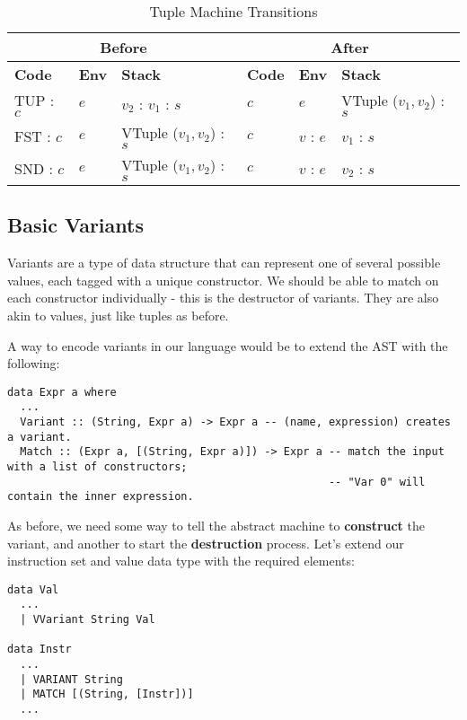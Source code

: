 \begin{table}[h]
    \centering
    \small
    \begin{tabular}{|l|l|l||l|l|l|}
        \hline
        \multicolumn{3}{|c||}{\textbf{Before}} & \multicolumn{3}{c|}{\textbf{After}} \\
        \hline
        \textbf{Code} & \textbf{Env} & \textbf{Stack} & \textbf{Code} & \textbf{Env} & \textbf{Stack} \\
        \hline
        TUP : \(c\) & \( e \) & \( v_2 \) : \( v_1 \) : \( s \) & \( c \) & \( e \) & VTuple (\( v_1, v_2 \)) : \( s \) \\
        FST : \(c\) & \( e \) & VTuple (\( v_1, v_2 \)) : \( s \) & \( c \) & \( v \) : \( e \) & \( v_1 \) : \( s \) \\
        SND : \(c\) & \( e \) & VTuple (\( v_1, v_2 \)) : \( s \) & \( c \) & \( v \) : \( e \) & \( v_2 \) : \( s \) \\
        \hline
    \end{tabular}
    \caption{Tuple Machine Transitions}
\end{table}

\subsection{Basic Variants}

Variants are a type of data structure that can represent one of several possible values,
each tagged with a unique constructor. We should be able to match on each constructor individually - this is the destructor of variants.
They are also akin to values, just like tuples as before.

A way to encode variants in our language would be to extend the AST with the following:

\begin{lstlisting}
data Expr a where
  ...
  Variant :: (String, Expr a) -> Expr a -- (name, expression) creates a variant.
  Match :: (Expr a, [(String, Expr a)]) -> Expr a -- match the input with a list of constructors;
                                                  -- "Var 0" will contain the inner expression.
\end{lstlisting}

As before, we need some way to tell the abstract machine to \textbf{construct} the variant, and another to start the \textbf{destruction} process.
Let's extend our instruction set and value data type with the required elements:

\begin{lstlisting}
data Val
  ...
  | VVariant String Val

data Instr
  ...
  | VARIANT String
  | MATCH [(String, [Instr])]
  ...
\end{lstlisting}

